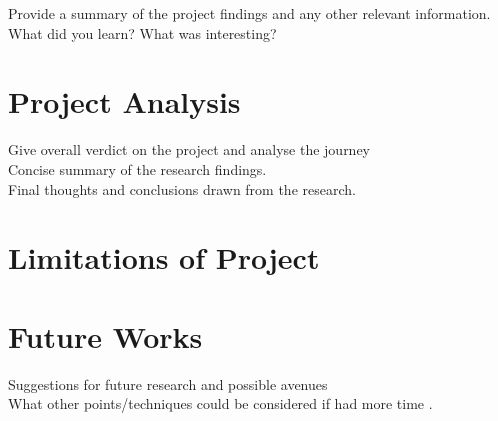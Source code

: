 Provide a summary of the project findings and any other relevant information.  What did you learn? What was interesting?
\section{Project Analysis}
Give overall verdict on the project and analyse the journey\\
Concise summary of the research findings.\\
Final thoughts and conclusions drawn from the research.

\section{Limitations of Project}

\section{Future Works}
Suggestions for future research and possible avenues\\
What other points/techniques could be considered if had more time \cite{seyyar2020privacy}.
